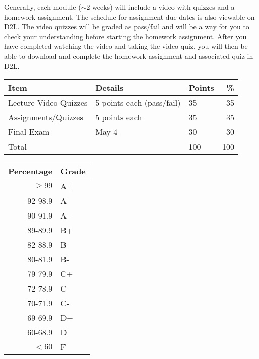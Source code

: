 \documentclass{tufte-handout}
\begin{document}
Generally, each module ($\sim$2 weeks) will include a video with quizzes and a homework assignment.  The schedule for assignment due dates is also viewable on D2L. The video quizzes will be graded as pass/fail and will be a way for you to check your understanding before starting the homework assignment. After you have completed watching the video and taking the video quiz, you will then be able to download and complete the homework assignment and associated quiz in D2L. 



\begin{table}
\begin{tabular}{l l l r}
Item & Details & Points &  \% \\
\hline
Lecture Video Quizzes & 5 points each (pass/fail) & 35 & 35 \\
Assignments/Quizzes  &  5 points each & 35 & 35\\
Final Exam & May 4 & 30 & 30 \\
\hline
Total & & 100 & 100 
\end{tabular}
\end{table}













\begin{margintable}
\begin{tabular}{rl}
Percentage & Grade \\
\hline 
$\ge99$ & A+ \\
92-98.9 & A \\
90-91.9 & A- \\
89-89.9 & B+ \\
82-88.9 & B \\
80-81.9 & B- \\
79-79.9 & C+ \\
72-78.9 & C \\
70-71.9 & C- \\
69-69.9 & D+ \\
60-68.9 & D \\
$<60$ & F \\
\hline
\end{tabular}
\end{margintable}
\end{document}
